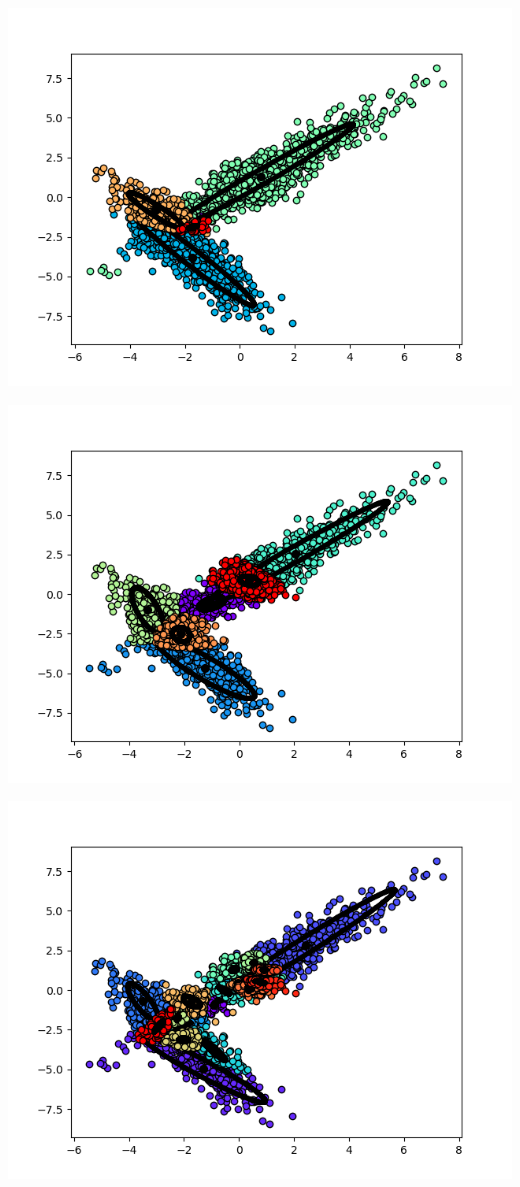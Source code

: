 \includegraphics[width=\textwidth]{./plots/plot_for_k_5.png}

\includegraphics[width=\textwidth]{./plots/plot_for_k_6.png}

\includegraphics[width=\textwidth]{./plots/plot_for_k_20.png}


